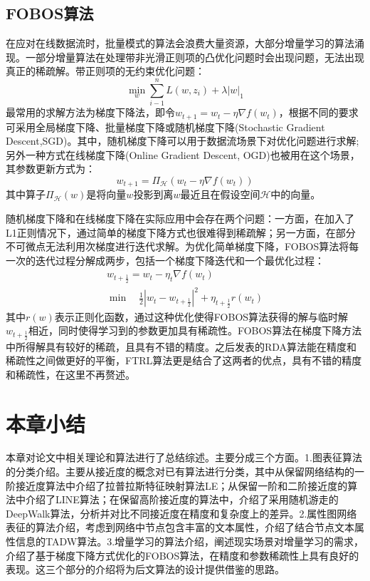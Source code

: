 \subsection{FOBOS算法}
在应对在线数据流时，批量模式的算法会浪费大量资源，大部分增量学习的算法涌现。一部分增量算法在处理带非光滑正则项的凸优化问题时会出现问题，无法出现真正的稀疏解。带正则项的无约束优化问题：
\begin{equation}
	\min_w \sum_{i-1}^{n}L(w,z_i) +\lambda|w|_1
\end{equation}
最常用的求解方法为梯度下降法，即令$w_{t+1} = w_t - \eta 
\nabla f(w_t)$，根据不同的要求可采用全局梯度下降、批量梯度下降或随机梯度下降(Stochastic Gradient Descent,SGD)。其中，随机梯度下降可以用于数据流场景下对优化问题进行求解;另外一种方式在线梯度下降(Online Gradient Descent, OGD)\cite{zinkevich2003online}也被用在这个场景，其参数更新方式为：
\begin{equation}
	w_{t+1} = \Pi_{\mathcal{H}}(w_t - \eta 
	\nabla f(w_t))
\end{equation}
其中算子$\Pi_{\mathcal{H}}(w)$是将向量$w$投影到离$w$最近且在假设空间$\mathcal{H}$中的向量。

随机梯度下降和在线梯度下降在实际应用中会存在两个问题：一方面，在加入了L1正则情况下，通过简单的梯度下降方式也很难得到稀疏解；另一方面，在部分不可微点无法利用次梯度进行迭代求解。为优化简单梯度下降，FOBOS算法将每一次的迭代过程分解成两步，包括一个梯度下降迭代和一个最优化过程：
\begin{equation}
\begin{aligned}
w_{t+\frac{1}{2}} = w_t -\eta_t 
\nabla f(w_t) \\
\min \quad \frac{1}{2}|w_t-w_{t+\frac{1}{2}}|^2 + \eta_{t+\frac{1}{2}}r(w_t)
\end{aligned}
\end{equation}
其中$r(w)$表示正则化函数，通过这种优化使得FOBOS算法获得的解与临时解$w_{t+\frac{1}{2}}$相近，同时使得学习到的参数更加具有稀疏性。FOBOS算法在梯度下降方法中所得解具有较好的稀疏，且具有不错的精度。之后发表的RDA算法能在精度和稀疏性之间做更好的平衡，FTRL算法更是结合了这两者的优点，具有不错的精度和稀疏性，在这里不再赘述。





\section{本章小结}
本章对论文中相关理论和算法进行了总结综述。主要分成三个方面。1.图表征算法的分类介绍。主要从接近度的概念对已有算法进行分类，其中从保留网络结构的一阶接近度算法中介绍了拉普拉斯特征映射算法LE；从保留一阶和二阶接近度的算法中介绍了LINE算法；在保留高阶接近度的算法中，介绍了采用随机游走的DeepWalk算法，分析并对比不同接近度在精度和复杂度上的差异。2.属性图网络表征的算法介绍，考虑到网络中节点包含丰富的文本属性，介绍了结合节点文本属性信息的TADW算法。3.增量学习的算法介绍，阐述现实场景对增量学习的需求，介绍了基于梯度下降方式优化的FOBOS算法，在精度和参数稀疏性上具有良好的表现。这三个部分的介绍将为后文算法的设计提供借鉴的思路。





	
